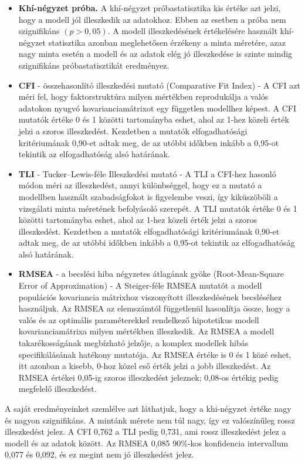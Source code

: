 \documentclass[
  letterpaper,
]{krantz}
\begin{document}
\begin{itemize}
\item
  \textbf{Khí-négyzet próba.} A khí-négyzet próbastatisztika kis értéke
  azt jelzi, hogy a modell jól illeszkedik az adatokhoz. Ebben az
  esetben a próba nem szignifikáns \((p>0,05)\). A modell
  illeszkedésének értékelésére használt khí-négyzet statisztika azonban
  meglehetősen érzékeny a minta méretére, azaz nagy minta esetén a
  modell és az adatok elég jó illeszkedése is szinte mindig szignifikáns
  próbastatisztikát eredményez.
\item
  \textbf{CFI} - összehasonlító illeszkedési mutató (Comparative Fit
  Index) - A CFI azt méri fel, hogy faktorstruktúra milyen mértékben
  reprodukálja a valós adatokon nyugvó kovarianciamátrixot egy független
  modellhez képest. A CFI mutatók értéke 0 és 1 közötti tartományba
  eshet, ahol az 1-hez közeli érték jelzi a szoros illeszkedést.
  Kezdetben a mutatók elfogadhatósági kritériumának 0,90-et adtak meg,
  de az utóbbi időkben inkább a 0,95-ot tekintik az elfogadhatóság alsó
  határának.
\item
  \textbf{TLI} - Tucker--Lewis-féle Illeszkedési mutató - A TLI a
  CFI-hez hasonló módon méri az illeszkedést, annyi különbséggel, hogy
  ez a mutató a modellben használt szabadságfokot is figyelembe veszi,
  így kiküszöböli a vizsgálati minta méretének befolyásoló szerepét. A
  TLI mutatók értéke 0 és 1 közötti tartományba eshet, ahol az 1-hez
  közeli érték jelzi a szoros illeszkedést. Kezdetben a mutatók
  elfogadhatósági kritériumának 0,90-et adtak meg, de az utóbbi időkben
  inkább a 0,95-ot tekintik az elfogadhatóság alsó határának.
\item
  \textbf{RMSEA} - a becslési hiba négyzetes átlagának gyöke
  (Root-Mean-Square Error of Approximation) - A Steiger-féle RMSEA
  mutatót a modell populációs kovariancia mátrixhoz viszonyított
  illeszkedésének becsléséhez használjuk. Az RMSEA az elemszámtól
  függetlenül hasonlítja össze, hogy a valós és az optimális
  paraméterekkel rendelkező hipotetikus modell kovarianciamátrixa milyen
  mértékben illeszkedik. Az RMSEA a modell takarékosságának megbízható
  jelzője, a komplex modellek hibás specifikálásának hatékony mutatója.
  Az RMSEA értéke is 0 és 1 közé eshet, itt azonban a kisebb, 0-hoz
  közel eső érték jelzi a jobb illeszkedést. Az RMSEA értékei 0,05-ig
  szoros illeszkedést jeleznek; 0,08-os értékig pedig megfelelő
  illeszkedést.
\end{itemize}

A saját eredményeinket szemlélve azt láthatjuk, hogy a khi-négyzet
értéke nagy és nagyon szignifikáns. A mintánk mérete nem túl nagy, így
ez valószínűleg rossz illeszkedést jelez. A CFI 0,762 a TLI pedig 0,731,
ami rossz illeszkedést jelez a modell és az adatok között. Az RMSEA
0,085 90\%-kos konfidencia intervallum 0,077 és 0,092, és ez megint nem
jó illeszkedést jelez.
\end{document}
